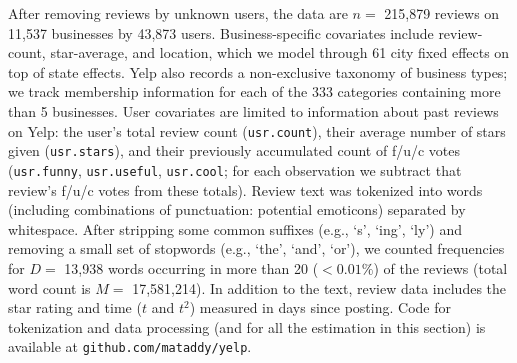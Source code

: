\documentclass[12pt]{article}
\newcommand{\cd}[1]{{\tt#1}}
\begin{document}
After removing reviews by unknown users, the data are $n=$ 215,879 reviews on
11,537 businesses by 43,873 users. Business-specific covariates include review-
count, star-average, and location, which we model through 61 city
fixed effects on top of state effects.  Yelp also records a non-exclusive
taxonomy of business types; we track membership information for each of the
333 categories  containing more than 5 businesses. User covariates are
limited to information about past reviews on Yelp: the user's total review count
(\cd{usr.count}), their average number of stars given (\cd{usr.stars}), and
their previously accumulated count of f/u/c votes (\cd{usr.funny},
\cd{usr.useful}, \cd{usr.cool}; for each observation we subtract that
review's f/u/c votes from these totals). Review text was tokenized into
words (including combinations of punctuation: potential emoticons) separated
by whitespace. After stripping some common suffixes (e.g., `s', `ing', `ly')
and removing a small set of stopwords (e.g., `the', `and', `or'), we counted
frequencies for $D=$ 13,938 words occurring in more than 20 ($< 0.01\%$) of
the reviews (total word count is $M=$ 17,581,214).  In addition to the text,
review data includes the star rating and time ($t$ and $t^2$)
measured in days since posting.  Code for tokenization and data processing
(and for all the estimation in this section) is available at
\cd{github.com/mataddy/yelp}.
\end{document}
